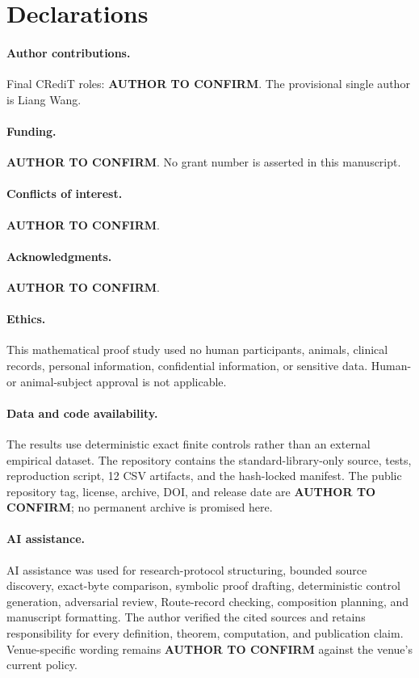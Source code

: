\documentclass[11pt]{article}
\theoremstyle{definition}
\begin{document}
\section*{Declarations}

\paragraph{Author contributions.}
Final CRediT roles: \textbf{AUTHOR TO CONFIRM}.  The provisional single
author is Liang Wang.

\paragraph{Funding.}
\textbf{AUTHOR TO CONFIRM}.  No grant number is asserted in this manuscript.

\paragraph{Conflicts of interest.}
\textbf{AUTHOR TO CONFIRM}.

\paragraph{Acknowledgments.}
\textbf{AUTHOR TO CONFIRM}.

\paragraph{Ethics.}
This mathematical proof study used no human participants, animals, clinical
records, personal information, confidential information, or sensitive data.
Human- or animal-subject approval is not applicable.

\paragraph{Data and code availability.}
The results use deterministic exact finite controls rather than an external
empirical dataset.  The repository contains the standard-library-only source,
tests, reproduction script, 12 CSV artifacts, and the hash-locked manifest.
The public repository tag, license, archive, DOI, and release date are
\textbf{AUTHOR TO CONFIRM}; no permanent archive is promised here.

\paragraph{AI assistance.}
AI assistance was used for research-protocol structuring, bounded source
discovery, exact-byte comparison, symbolic proof drafting, deterministic
control generation, adversarial review, Route-record checking, composition
planning, and manuscript formatting.  The author verified the cited sources
and retains responsibility for every definition, theorem, computation, and
publication claim.  Venue-specific wording remains \textbf{AUTHOR TO
CONFIRM} against the venue's current policy.



\end{document}
